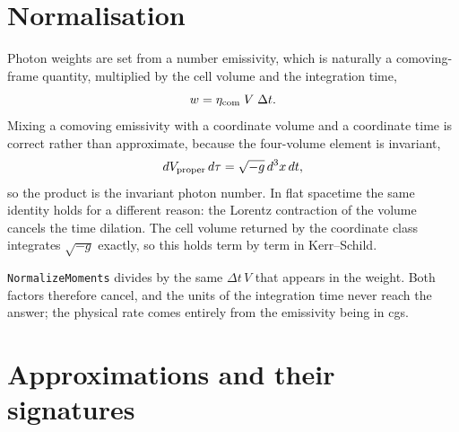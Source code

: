 \documentclass[11pt]{article}
\begin{document}
\section{Normalisation}

Photon weights are set from a number emissivity, which is naturally a comoving-frame
quantity, multiplied by the cell volume and the integration time,
\begin{equation}
  w = \eta_{\rm com} \; V \; \Delta t .
\end{equation}
Mixing a comoving emissivity with a coordinate volume and a coordinate time is correct
rather than approximate, because the four-volume element is invariant,
\begin{equation}
  dV_{\rm proper} \, d\tau = \sqrt{-g} \, d^3x \, dt ,
\end{equation}
so the product is the invariant photon number. In flat spacetime the same identity holds
for a different reason: the Lorentz contraction of the volume cancels the time dilation.
The cell volume returned by the coordinate class integrates $\sqrt{-g}$ exactly, so this
holds term by term in Kerr--Schild.

\texttt{NormalizeMoments} divides by the same $\Delta t \, V$ that appears in the weight.
Both factors therefore cancel, and the units of the integration time never reach the
answer; the physical rate comes entirely from the emissivity being in cgs.

\section{Approximations and their signatures}
\end{document}
